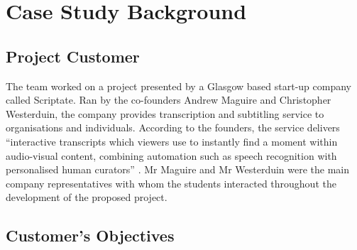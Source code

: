 \documentclass{l3proj}
\begin{document}





\section{Case Study Background}




\subsection{Project Customer}

The team worked on a project presented by a Glasgow based start-up company called Scriptate. Ran by the co-founders Andrew Maguire and Christopher Westerduin, the company provides transcription and subtitling service to organisations and individuals. According to the founders, the service delivers “interactive transcripts which viewers use to instantly find a moment within audio-visual content, combining automation such as speech recognition with personalised human curators”  \cite{edgeapp}. Mr Maguire and Mr Westerduin were the main company representatives with whom the students interacted throughout the development of the proposed project.

\subsection{Customer's Objectives}
\end{document}
